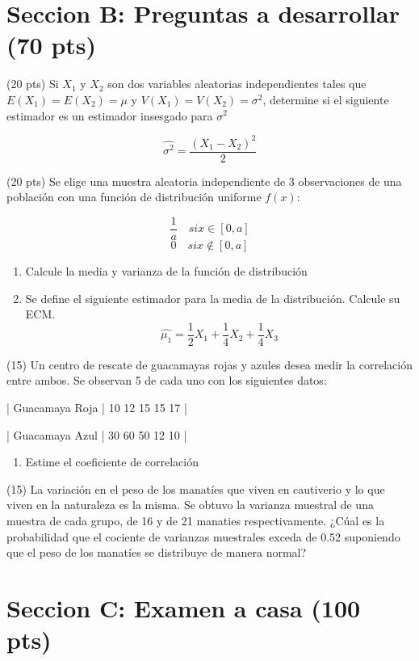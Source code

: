 \documentclass[addpoints]{exam}
\theoremstyle{mytheor}
\begin{document}
  \section*{Seccion B: Preguntas a desarrollar (70 pts)}
  
  
  \begin{questions} 
  \question (20 pts) Si $X_1$ y $X_2$ son dos variables aleatorias independientes tales que $E(X_1) = E(X_2) = \mu$ y $V(X_1) = V(X_2) = \sigma^2$, determine si el siguiente estimador es un estimador insesgado para $\sigma^2$

  $$\hat{\sigma^2} = \frac{(X_1-X_2)^2}{2}$$
  
  
  \question (20 pts) Se elige una muestra aleatoria independiente de 3 observaciones de una población con una función de distribución uniforme $f(x)$:
  
  $$ \frac{1}{a}  \quad  si x \in [0, a]$$
  $$ 0  \quad  si x 	\notin [0, a]$$
  
  \begin{enumerate}
  \item Calcule la media y varianza de la función de distribución
  \item Se define el siguiente estimador para la media de la distribución. Calcule su ECM.
  $$\hat{\mu_1} = \frac{1}{2} X_1 + \frac{1}{4} X_2 + \frac{1}{4} X_3$$
  \end{enumerate}
  
  \question (15) Un centro de rescate de guacamayas rojas y azules desea medir la correlación entre ambos. Se observan 5 de cada uno con los siguientes datos:
  
| Guacamaya Roja | 10 12 15 15 17 |

| Guacamaya Azul | 30 60 50 12 10 |

  \begin{enumerate}
  \item Estime el coeficiente de correlación
  \end{enumerate}
  
  \question (15) La variación en el peso de los manatíes que viven en cautiverio y lo que viven en la naturaleza es la misma. Se obtuvo la varianza muestral de una muestra de cada grupo, de 16 y de 21 manaties respectivamente. ¿Cúal es la probabilidad que el cociente de varianzas muestrales exceda de 0.52 suponiendo que el peso de los manatíes se distribuye de manera normal?

  \end{questions}
  
  
  \section*{Seccion C: Examen a casa (100 pts)}
  
\end{document}
